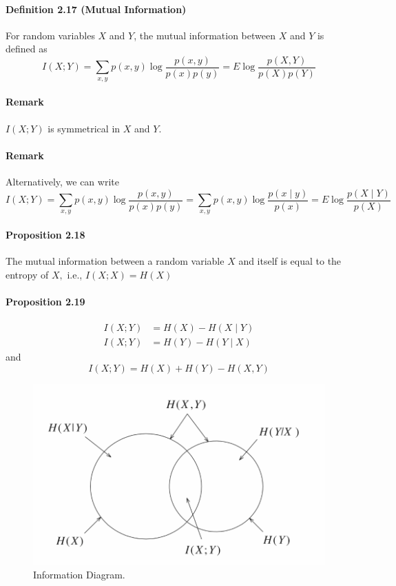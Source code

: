 \documentclass[8pt]{article}
\begin{document}
\begin{tcolorbox}
\paragraph{Definition 2.17 (Mutual Information)} For random variables $X$ and $Y$, the mutual information between $X$ and $Y$ is defined as
$$
I(X ; Y)=\sum_{x, y} p(x, y) \log \frac{p(x, y)}{p(x) p(y)}=E \log \frac{p(X, Y)}{p(X) p(Y)}
$$
\paragraph{Remark} $I(X ; Y)$ is symmetrical in $X$ and $Y$.
\paragraph{Remark} Alternatively, we can write
$$
I(X ; Y)=\sum_{x, y} p(x, y) \log \frac{p(x, y)}{p(x) p(y)}=\sum_{x, y} p(x, y) \log \frac{p(x \mid y)}{p(x)}=E \log \frac{p(X \mid Y)}{p(X)}
$$
\paragraph{Proposition 2.18} The mutual information between a random variable $X$ and itself is equal to the entropy of $X,$ i.e., $I(X ; X)=H(X)$
\\
\paragraph{Proposition 2.19}
$$
\begin{aligned}
I(X ; Y) &=H(X)-H(X \mid Y) \\
I(X ; Y) &=H(Y)-H(Y \mid X)
\end{aligned}
$$
and
$$
I(X ; Y)=H(X)+H(Y)-H(X, Y)
$$
\end{tcolorbox}

\begin{figure}[!h]
    \centering
    \includegraphics[width=0.5\linewidth]{imgs/def2_14.png}
    \caption{Information Diagram.}
    \label{fig:my_label}
\end{figure}
\end{document}
